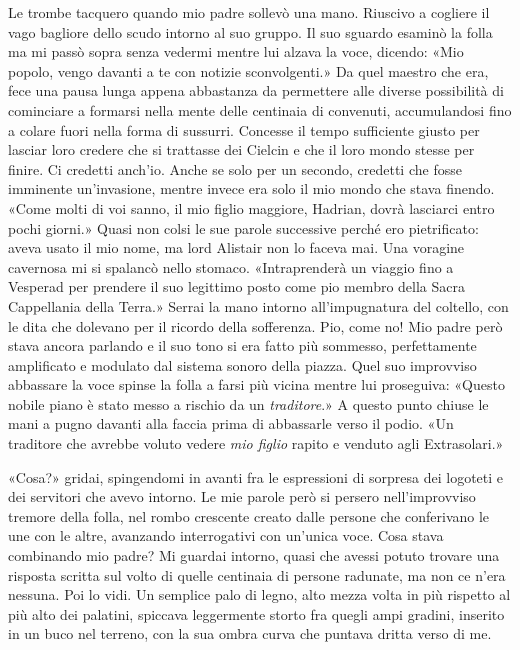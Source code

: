 Le trombe tacquero quando mio padre sollevò una mano. Riuscivo a
cogliere il vago bagliore dello scudo intorno al suo gruppo. Il suo
sguardo esaminò la folla ma mi passò sopra senza vedermi mentre lui
alzava la voce, dicendo: «Mio popolo, vengo davanti a te con notizie
sconvolgenti.» Da quel maestro che era, fece una pausa lunga appena
abbastanza da permettere alle diverse possibilità di cominciare a
formarsi nella mente delle centinaia di convenuti, accumulandosi fino a
colare fuori nella forma di sussurri. Concesse il tempo sufficiente
giusto per lasciar loro credere che si trattasse dei Cielcin e che il
loro mondo stesse per finire. Ci credetti anch'io. Anche se solo per un
secondo, credetti che fosse imminente un'invasione, mentre invece era
solo il mio mondo che stava finendo. «Come molti di voi sanno, il mio
figlio maggiore, Hadrian, dovrà lasciarci entro pochi giorni.» Quasi non
colsi le sue parole successive perché ero pietrificato: aveva usato il
mio nome, ma lord Alistair non lo faceva mai. Una voragine cavernosa mi
si spalancò nello stomaco. «Intraprenderà un viaggio fino a Vesperad per
prendere il suo legittimo posto come pio membro della Sacra Cappellania
della Terra.» Serrai la mano intorno all'impugnatura del coltello, con
le dita che dolevano per il ricordo della sofferenza. Pio, come no! Mio
padre però stava ancora parlando e il suo tono si era fatto più
sommesso, perfettamente amplificato e modulato dal sistema sonoro della
piazza. Quel suo improvviso abbassare la voce spinse la folla a farsi
più vicina mentre lui proseguiva: «Questo nobile piano è stato messo a
rischio da un \emph{traditore}.» A questo punto chiuse le mani a pugno
davanti alla faccia prima di abbassarle verso il podio. «Un traditore
che avrebbe voluto vedere \emph{mio figlio} rapito e venduto agli
Extrasolari.»

«Cosa?» gridai, spingendomi in avanti fra le espressioni di sorpresa dei
logoteti e dei servitori che avevo intorno. Le mie parole però si
persero nell'improvviso tremore della folla, nel rombo crescente creato
dalle persone che conferivano le une con le altre, avanzando
interrogativi con un'unica voce. Cosa stava combinando mio padre? Mi
guardai intorno, quasi che avessi potuto trovare una risposta scritta
sul volto di quelle centinaia di persone radunate, ma non ce n'era
nessuna. Poi lo vidi. Un semplice palo di legno, alto mezza volta in più
rispetto al più alto dei palatini, spiccava leggermente storto fra
quegli ampi gradini, inserito in un buco nel terreno, con la sua ombra
curva che puntava dritta verso di me.


